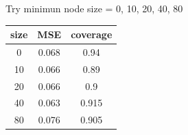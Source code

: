 \documentclass[]{article}
\begin{document}
Try minimun node size = 0, 10, 20, 40, 80

\begin{longtable}[]{@{}ccc@{}}
\toprule
\begin{minipage}[b]{0.09\columnwidth}\centering\strut
size\strut
\end{minipage} & \begin{minipage}[b]{0.10\columnwidth}\centering\strut
MSE\strut
\end{minipage} & \begin{minipage}[b]{0.13\columnwidth}\centering\strut
coverage\strut
\end{minipage}\tabularnewline
\midrule
\endhead
\begin{minipage}[t]{0.09\columnwidth}\centering\strut
0\strut
\end{minipage} & \begin{minipage}[t]{0.10\columnwidth}\centering\strut
0.068\strut
\end{minipage} & \begin{minipage}[t]{0.13\columnwidth}\centering\strut
0.94\strut
\end{minipage}\tabularnewline
\begin{minipage}[t]{0.09\columnwidth}\centering\strut
10\strut
\end{minipage} & \begin{minipage}[t]{0.10\columnwidth}\centering\strut
0.066\strut
\end{minipage} & \begin{minipage}[t]{0.13\columnwidth}\centering\strut
0.89\strut
\end{minipage}\tabularnewline
\begin{minipage}[t]{0.09\columnwidth}\centering\strut
20\strut
\end{minipage} & \begin{minipage}[t]{0.10\columnwidth}\centering\strut
0.066\strut
\end{minipage} & \begin{minipage}[t]{0.13\columnwidth}\centering\strut
0.9\strut
\end{minipage}\tabularnewline
\begin{minipage}[t]{0.09\columnwidth}\centering\strut
40\strut
\end{minipage} & \begin{minipage}[t]{0.10\columnwidth}\centering\strut
0.063\strut
\end{minipage} & \begin{minipage}[t]{0.13\columnwidth}\centering\strut
0.915\strut
\end{minipage}\tabularnewline
\begin{minipage}[t]{0.09\columnwidth}\centering\strut
80\strut
\end{minipage} & \begin{minipage}[t]{0.10\columnwidth}\centering\strut
0.076\strut
\end{minipage} & \begin{minipage}[t]{0.13\columnwidth}\centering\strut
0.905\strut
\end{minipage}\tabularnewline
\bottomrule
\end{longtable}
\end{document}
